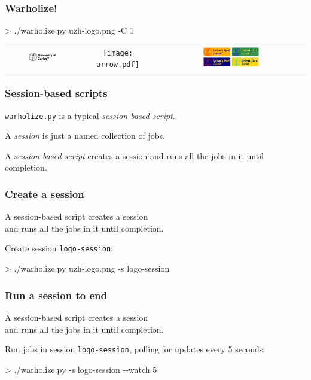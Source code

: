 \documentclass[english,serif,mathserif,usenames,dvipsnames]{beamer}
\begin{document}
\begin{frame}
  \frametitle{Warholize!}

\begin{semiverbatim}
    > ./warholize.py uzh-logo.png -C 1
\end{semiverbatim}

  \begin{tabular}[c]{ccc}
    \includegraphics[width=0.4\textwidth]{uzh-logo.png}
    &
    \texttt{[image: arrow.pdf]}
    &
    \includegraphics[width=0.4\textwidth]{warholized-uzh-logo.png}
  \end{tabular}
\end{frame}


\begin{frame}
  \frametitle{Session-based scripts}

  \texttt{warholize.py} is a typical \emph{session-based script}.

  \+ A \emph{session} is just a named collection of jobs.

  \+ A \emph{session-based script} creates a session and runs all the
  jobs in it until completion.
\end{frame}


\begin{frame}
  \frametitle{Create a session}

  A session-based script \alert{creates a session}
  \\
  and runs all the jobs in it until completion.

  \+ Create session \texttt{logo-session}:
\begin{semiverbatim}
    > ./warholize.py uzh-logo.png -s logo-session
\end{semiverbatim}
\end{frame}


\begin{frame}
  \frametitle{Run a session to end}

  A session-based script creates a session
  \\
  and \alert{runs all the jobs in it until completion.}

  \+ Run jobs in session \texttt{logo-session},
  polling for updates every 5 seconds:
\begin{semiverbatim}
    > ./warholize.py -s logo-session -{}-watch 5
\end{semiverbatim}

  \+ 
\end{frame}
\end{document}

